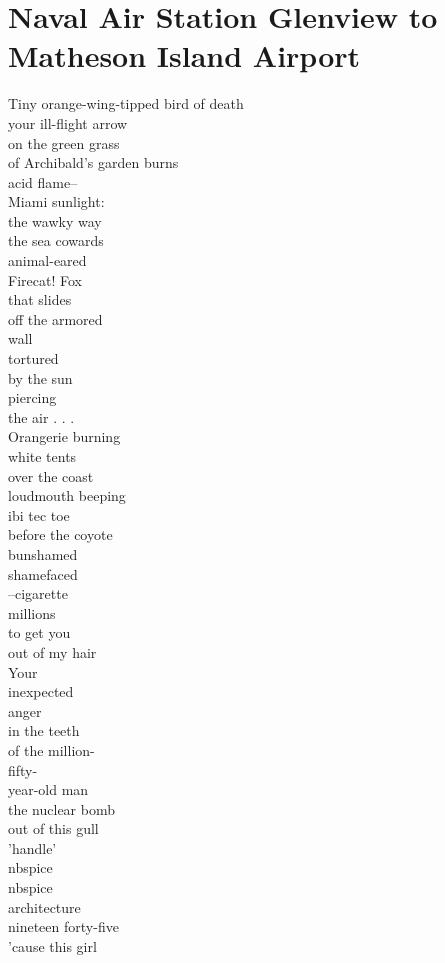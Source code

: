 \documentclass[smalldemyvopaper,11pt,twoside,onecolumn,openright,extrafontsizes]{memoir}
\begin{document}
\chapter{Naval Air Station Glenview to Matheson Island Airport}
Tiny orange-wing-tipped bird of death
\\your ill-flight arrow
\\on the green grass
\\of Archibald's garden burns
\\acid flame--
\\Miami sunlight:
\\the wawky way
\\the sea cowards
\\animal-eared
\\Firecat! Fox
\\that slides
\\off the armored
\\wall
\\tortured
\\by the sun
\\piercing
\\the air . . .
\\Orangerie burning
\\white tents
\\over the coast
\\loudmouth beeping
\\ibi tec toe
\\before the coyote
\\bunshamed
\\shamefaced
\\--cigarette
\\millions
\\to get you
\\out of my hair
\\Your
\\inexpected
\\anger
\\in the teeth
\\of the million-
\\fifty-
\\year-old man
\\the nuclear bomb
\\out of this gull
\\'handle'
\\nbspice
\\nbspice
\\architecture
\\nineteen forty-five
\\'cause this girl
\end{document}
